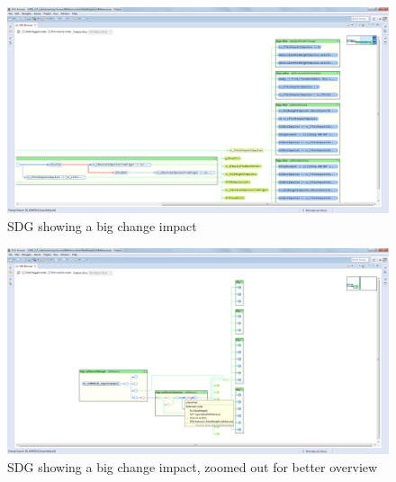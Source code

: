 \begin{figure}[p]
  \centering
    \includegraphics[width=\textwidth]{bilder/manual-big2}
  \caption{SDG showing a big change impact}
  \label{fig:manual-big2}
\end{figure}

\begin{figure}[p]
  \centering
    \includegraphics[width=\textwidth]{bilder/manual-big_zoomed}
  \caption{SDG showing a big change impact, zoomed out for better overview}
  \label{fig:manual-big_zoomed}
\end{figure}

